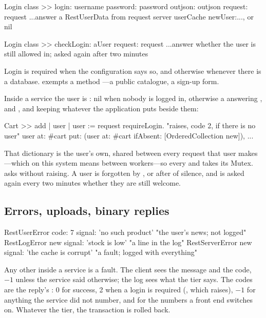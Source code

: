 \begin{st}
Login class >> login: username password: password outjson: outjson request: request
    ...answer a RestUserData from request server userCache newUser:..., or nil

Login class >> checkLogin: aUser request: request
    ...answer whether the user is still allowed in; asked again after two minutes
\end{st}

Login is required when the configuration says so, and otherwise whenever
there is a database.  exempts a method
---a public catalogue, a sign-up form.

Inside a service the user is : nil when nobody is
logged in, otherwise a  answering ,
 and , and keeping whatever the application puts beside
them:

\begin{st}
Cart >> add
    | user |
    user := request requireLogin.              "raises, code 2, if there is no user"
    user at: #cart put: (user at: #cart ifAbsent: [OrderedCollection new]), ...
\end{st}

That dictionary is the user's own, shared between every request that user
makes---which on this system means between workers---so every  and
 takes its Mutex.  asks without raising.
A user is forgotten by , or after  of
silence, and  is asked again every two
minutes whether they are still welcome.

\subsection{Errors, uploads, binary replies}

\begin{st}
RestUserError code: 7 signal: 'no such product'     "the user's news; not logged"
RestLogError new signal: 'stock is low'             "a line in the log"
RestServerError new signal: 'the cache is corrupt'  "a fault; logged with everything"
\end{st}

Any other  inside a service is a fault. The client sees the message
and the code, $-1$ unless the service said otherwise; the log sees what the
tier says. The codes are the reply's : 0 for success, 2 when
a login is required (, which 
raises), $-1$ for anything the service did not number, and
 for the numbers a front end switches on.
Whatever the tier, the transaction is rolled back.

